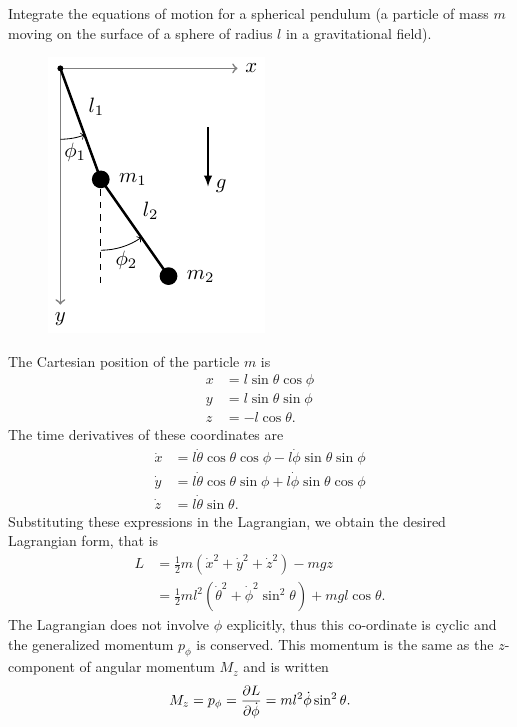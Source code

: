\begin{problem}
{
Integrate the equations of motion for a spherical pendulum (a particle of mass $m$ moving on the surface of a sphere of radius $l$ in a gravitational field).
\begin{figure}[H]
    \centering
    \includegraphics[page=7]{Figures/tikzpics.pdf}
\end{figure}
}
{
The Cartesian position of the particle $m$ is
\begin{align*}
    x &= l\sin{\theta}\cos{\phi} \\
    y &= l\sin{\theta}\sin{\phi} \\
    z &= -l\cos{\theta}.
\end{align*}
The time derivatives of these coordinates are
\begin{align*}
    \Dot{x} &= l\Dot{\theta}\cos{\theta}\cos{\phi} - l\Dot{\phi}\sin{\theta}\sin{\phi} \\
    \Dot{y} &= l\Dot{\theta}\cos{\theta}\sin{\phi} + l\Dot{\phi}\sin{\theta}\cos{\phi} \\
    \Dot{z} &= l\Dot{\theta}\sin{\theta}.
\end{align*}
Substituting these expressions in the Lagrangian, we obtain the desired Lagrangian form, that is
\begin{align*}
    L &= \frac{1}{2}m\left(\Dot{x}^2+\Dot{y}^2+\Dot{z}^2\right) - mgz \\
    &= \frac{1}{2}ml^2\left(\Dot{\theta}^2+\Dot{\phi}^2\sin^2{\theta}\right) + mgl\cos{\theta}.
\end{align*}
The Lagrangian does not involve $\phi$ explicitly, thus this co-ordinate is cyclic and the generalized momentum $p_\phi$ is conserved. This momentum is the same as the $z$-component of angular momentum $M_z$ and is written
\begin{equation} \label{C3P4_Mz}
    M_z = p_{\phi} = \pd{L}{\Dot{\phi}} = ml^2\Dot{\phi}\sin^2{\theta}.

\end{equation}}
\end{problem}
